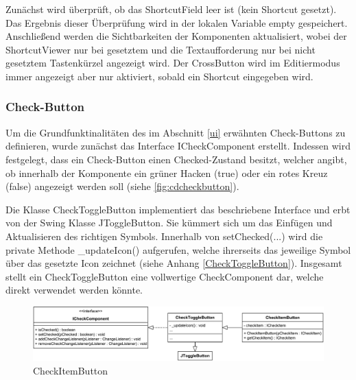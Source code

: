 \vspace{20px}



Zunächst wird überprüft, ob das ShortcutField leer ist (kein Shortcut gesetzt). Das Ergebnis dieser Überprüfung wird in der lokalen Variable empty gespeichert. Anschließend werden die Sichtbarkeiten der Komponenten aktualisiert, wobei der ShortcutViewer nur bei gesetztem und die Textaufforderung nur bei nicht gesetztem Tastenkürzel angezeigt wird. Der CrossButton wird im Editiermodus immer angezeigt aber nur aktiviert, sobald ein Shortcut eingegeben wird.

\newpage

\subsubsection{Check-Button}

Um die Grundfunktinalitäten des im Abschnitt \ref{ui} erwähnten Check-Buttons zu definieren, wurde zunächst das Interface ICheckComponent erstellt. Indessen wird festgelegt, dass ein Check-Button einen Checked-Zustand besitzt, welcher angibt, ob innerhalb der Komponente ein grüner Hacken (true) oder ein rotes Kreuz (false) angezeigt werden soll (siehe \autoref{fig:cdcheckbutton}).

Die Klasse CheckToggleButton implementiert das beschriebene Interface und erbt von der Swing Klasse JToggleButton. Sie kümmert sich um das Einfügen und Aktualisieren des richtigen Symbols. Innerhalb von setChecked(...) wird die private Methode \_updateIcon() aufgerufen, welche ihrerseits das jeweilige Symbol über das gesetzte Icon zeichnet (siehe Anhang \ref{CheckToggleButton}). Insgesamt stellt ein CheckToggleButton eine vollwertige CheckComponent dar, welche direkt verwendet werden könnte.

\begin{figure}[H]
	\centering
	\includegraphics[width=1\linewidth]{../graphic/diagrams/CD_CheckButton/CD_CheckButton}
	\caption{CheckItemButton}
	\label{fig:cdcheckbutton}
\end{figure}

\vspace{-5px}


